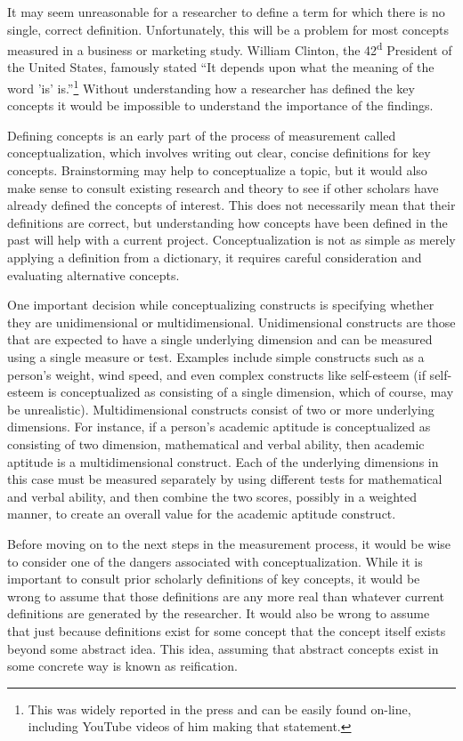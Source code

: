 It may seem unreasonable for a researcher to define a term for which there is no single, correct definition. Unfortunately, this will be a problem for most concepts measured in a business or marketing study. William Clinton, the 42\textsuperscript{d} President of the United States, famously stated ``It depends upon what the meaning of the word 'is' is.''\footnote{This was widely reported in the press and can be easily found on-line, including YouTube videos of him making that statement.} Without understanding how a researcher has defined the key concepts it would be impossible to understand the importance of the findings.

Defining concepts is an early part of the process of measurement called conceptualization, which involves writing out clear, concise definitions for key concepts. Brainstorming may help to conceptualize a topic, but it would also make sense to consult existing research and theory to see if other scholars have already defined the concepts of interest. This does not necessarily mean that their definitions are correct, but understanding how concepts have been defined in the past will help with a current project. Conceptualization is not as simple as merely applying a definition from a dictionary, it requires careful consideration and evaluating alternative concepts.

One important decision while conceptualizing constructs is specifying whether they are unidimensional or multidimensional. Unidimensional constructs are those that are expected to have a single underlying dimension and can be measured using a single measure or test. Examples include simple constructs such as a person's weight, wind speed, and even complex constructs like self-esteem (if self-esteem is conceptualized as consisting of a single dimension, which of course, may be unrealistic). Multidimensional constructs consist of two or more underlying dimensions. For instance, if a person's academic aptitude is conceptualized as consisting of two dimension, mathematical and verbal ability, then academic aptitude is a multidimensional construct. Each of the underlying dimensions in this case must be measured separately by using different tests for mathematical and verbal ability, and then combine the two scores, possibly in a weighted manner, to create an overall value for the academic aptitude construct.

Before moving on to the next steps in the measurement process, it would be wise to consider one of the dangers associated with conceptualization. While it is important to consult prior scholarly definitions of key concepts, it would be wrong to assume that those definitions are any more real than whatever current definitions are generated by the researcher. It would also be wrong to assume that just because definitions exist for some concept that the concept itself exists beyond some abstract idea. This idea, assuming that abstract concepts exist in some concrete way is known as reification.

